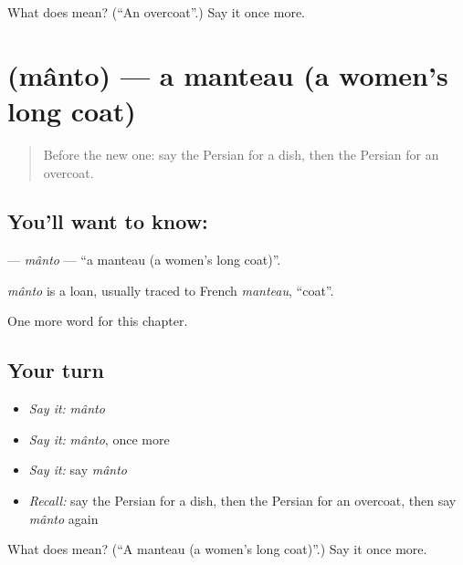 \begin{tcolorbox}[breakable,colback=teal!4,colframe=teal!35!black,title={Before you move on}]
What does  mean? (\textquotedblleft{}An overcoat\textquotedblright{}.) Say it once more.
\end{tcolorbox}
\section[\texorpdfstring{\fa{مانتو} (mânto)}{مانتو (mânto)}]{ (mânto) — a manteau (a women's long coat)}

\label{lesson:FA-C204-manto}



\begin{quote}
Before the new one: say the Persian for a dish, then the Persian for an overcoat.
\end{quote}

\subsection*{You'll want to know: }
\textbf{} — \emph{mânto} — \textquotedblleft{}a manteau (a women's long coat)\textquotedblright{}.

\begin{cousinweb}
\emph{mânto} is a loan, usually traced to French \emph{manteau}, \textquotedblleft{}coat\textquotedblright{}.
\end{cousinweb}

\begin{grammarlens}[title={What you've built}]
One more word for this chapter.
\end{grammarlens}

\subsection*{Your turn}
\begin{itemize}
\raggedright
  \item \emph{Say it:} \emph{mânto}
  \item \emph{Say it:} \emph{mânto}, once more
  \item \emph{Say it:} say \emph{mânto}
  \item \emph{Recall:} say the Persian for a dish, then the Persian for an overcoat, then say \emph{mânto} again
\end{itemize}

\begin{tcolorbox}[breakable,colback=teal!4,colframe=teal!35!black,title={Before you move on}]
What does  mean? (\textquotedblleft{}A manteau (a women's long coat)\textquotedblright{}.) Say it once more.
\end{tcolorbox}
